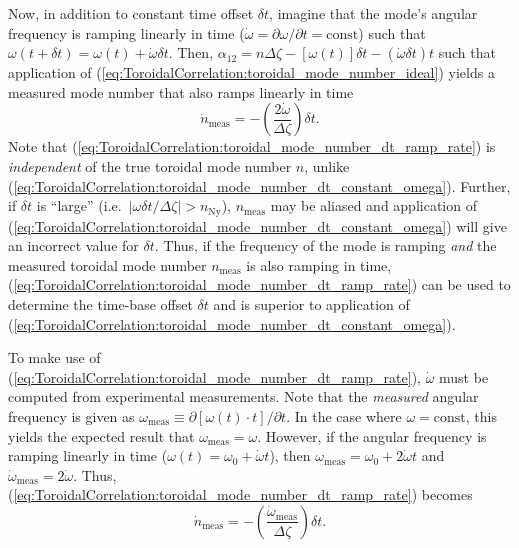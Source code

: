 Now, in addition to constant time offset $\delta t$,
imagine that the mode's angular frequency is ramping linearly in time
($\dot{\omega} = \partial \omega / \partial t = \text{const}$) such that
$\omega(t + \delta t) = \omega(t) + \dot{\omega} \delta t$.
Then,
$\alpha_{12}
=
n \Delta \zeta - [\omega(t)] \delta t - (\dot{\omega} \delta t) t$
such that application of
(\ref{eq:ToroidalCorrelation:toroidal_mode_number_ideal})
yields a measured mode number that also ramps linearly in time
\begin{equation}
  \dot{n}_{\text{meas}}
  =
  - \left( \frac{2 \dot{\omega}}{\Delta \zeta} \right) \delta t.
  \label{eq:ToroidalCorrelation:toroidal_mode_number_dt_ramp_rate}
\end{equation}
Note that (\ref{eq:ToroidalCorrelation:toroidal_mode_number_dt_ramp_rate}) is
\emph{independent} of the true toroidal mode number $n$,
unlike (\ref{eq:ToroidalCorrelation:toroidal_mode_number_dt_constant_omega}).
Further, if $\delta t$ is ``large''
(i.e.\ $|\omega \delta t / \Delta \zeta| > n_{\text{Ny}}$),
$n_{\text{meas}}$ may be aliased and application of
(\ref{eq:ToroidalCorrelation:toroidal_mode_number_dt_constant_omega})
will give an incorrect value for $\delta t$.
Thus, if the frequency of the mode is ramping \emph{and}
the measured toroidal mode number $n_{\text{meas}}$ is also ramping in time,
(\ref{eq:ToroidalCorrelation:toroidal_mode_number_dt_ramp_rate})
can be used to determine the time-base offset $\delta t$ and
is superior to application of
(\ref{eq:ToroidalCorrelation:toroidal_mode_number_dt_constant_omega}).

\graffito{\textcolor{red}{Improve explanation}}
To make use of (\ref{eq:ToroidalCorrelation:toroidal_mode_number_dt_ramp_rate}),
$\dot{\omega}$ must be computed from experimental measurements.
Note that the \emph{measured} angular frequency is given as
$\omega_{\text{meas}} \equiv \partial[\omega(t) \cdot t] / \partial t$.
In the case where $\omega = \text{const}$,
this yields the expected result that $\omega_{\text{meas}} = \omega$.
However, if the angular frequency is ramping linearly in time
($\omega(t) = \omega_0 + \dot{\omega} t$), then
$\omega_{\text{meas}} = \omega_0 + 2 \dot{\omega} t$ and
$\dot{\omega}_{\text{meas}} = 2 \dot{\omega}$.
Thus, (\ref{eq:ToroidalCorrelation:toroidal_mode_number_dt_ramp_rate}) becomes
\begin{equation}
  \dot{n}_{\text{meas}}
  =
  - \left( \frac{\dot{\omega}_{\text{meas}}}{\Delta \zeta} \right) \delta t.
  \label{eq:ToroidalCorrelation:toroidal_mode_number_dt_ramp_rate_lab_frame}
\end{equation}

